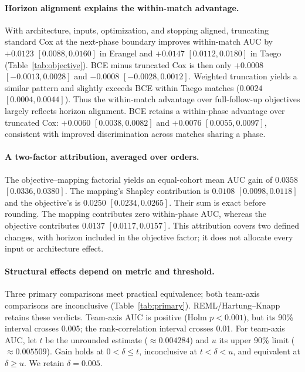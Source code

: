 \documentclass[sigconf,anonymous,nonacm]{acmart}
\begin{document}
\paragraph{Horizon alignment explains the within-match advantage.}

With architecture, inputs, optimization, and stopping aligned, truncating standard Cox at the next-phase boundary improves within-match AUC by $+0.0123$ $[0.0088,\allowbreak 0.0160]$ in Erangel and $+0.0147$ $[0.0112,\allowbreak 0.0180]$ in Taego (Table~\ref{tab:objective}). BCE minus truncated Cox is then only $+0.0008$ $[-0.0013,\allowbreak 0.0028]$ and $-0.0008$ $[-0.0028,\allowbreak 0.0012]$. Weighted truncation yields a similar pattern and slightly exceeds BCE within Taego matches ($0.0024$ $[0.0004,\allowbreak 0.0044]$). Thus the within-match advantage over full-follow-up objectives largely reflects horizon alignment. BCE retains a within-phase advantage over truncated Cox: $+0.0060$ $[0.0038,\allowbreak 0.0082]$ and $+0.0076$ $[0.0055,\allowbreak 0.0097]$, consistent with improved discrimination across matches sharing a phase.

\paragraph{A two-factor attribution, averaged over orders.}
The objective--mapping factorial yields an equal-cohort mean AUC gain of $0.0358$ $[0.0336,\allowbreak 0.0380]$. The mapping's Shapley contribution is $0.0108$ $[0.0098,\allowbreak 0.0118]$ and the objective's is $0.0250$ $[0.0234,\allowbreak 0.0265]$. Their sum is exact before rounding. The mapping contributes zero within-phase AUC, whereas the objective contributes $0.0137$ $[0.0117,\allowbreak 0.0157]$. This attribution covers two defined changes, with horizon included in the objective factor; it does not allocate every input or architecture effect.

\paragraph{Structural effects depend on metric and threshold.}

Three primary comparisons meet practical equivalence; both team-axis comparisons are inconclusive (Table~\ref{tab:primary}). REML/Hartung--Knapp retains these verdicts. Team-axis AUC is positive (Holm $p<0.001$), but its 90\% interval crosses 0.005; the rank-correlation interval crosses 0.01. For team-axis AUC, let $t$ be the unrounded estimate ($\approx0.004284$) and $u$ its upper 90\% limit ($\approx0.005509$). Gain holds at $0<\delta\leq t$, inconclusive at $t<\delta<u$, and equivalent at $\delta\geq u$. We retain $\delta=0.005$.
\end{document}
